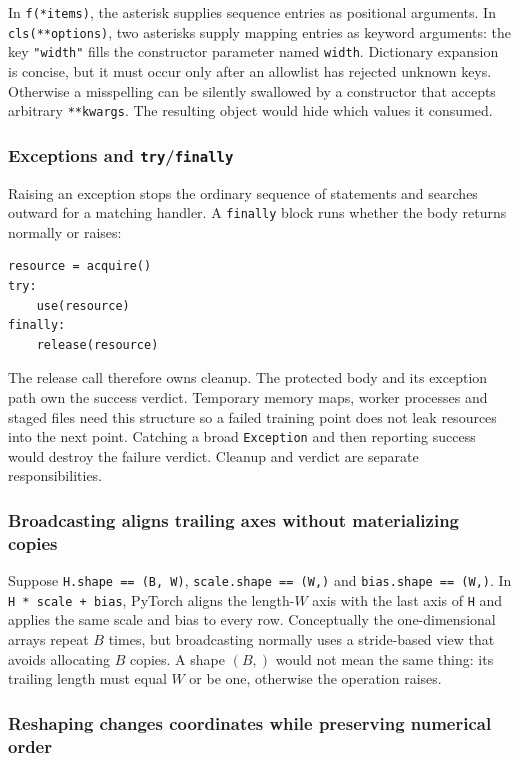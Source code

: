 \documentclass[10pt,aps,prd,twocolumn,nofootinbib]{revtex4-2}
\newcommand{\code}[1]{\texttt{#1}}
\begin{document}
In \code{f(*items)}, the asterisk supplies sequence entries as positional
arguments.  In \code{cls(**options)}, two asterisks supply mapping entries as
keyword arguments: the key \code{"width"} fills the constructor parameter
named \code{width}.  Dictionary expansion is concise, but it must occur only
after an allowlist has rejected unknown keys.  Otherwise a misspelling can be
silently swallowed by a constructor that accepts arbitrary
\code{**kwargs}.  The resulting object would hide which values it consumed.

\subsubsection{Exceptions and \code{try}/\code{finally}}

Raising an exception stops the ordinary sequence of statements and searches
outward for a matching handler.  A \code{finally} block runs whether the body
returns normally or raises:
\begin{verbatim}
resource = acquire()
try:
    use(resource)
finally:
    release(resource)
\end{verbatim}
The release call therefore owns cleanup.  The protected body and its exception
path own the success verdict.  Temporary memory maps, worker processes and staged files need this structure so a failed training
point does not leak resources into the next point.  Catching a broad
\code{Exception} and then reporting success would destroy the failure
verdict.  Cleanup and verdict are separate responsibilities.

\subsubsection{Broadcasting aligns trailing axes without materializing copies}

Suppose \code{H.shape == (B, W)}, \code{scale.shape == (W,)} and
\code{bias.shape == (W,)}.  In \code{H * scale + bias}, PyTorch aligns the
length-$W$ axis with the last axis of \code{H} and applies the same scale and
bias to every row.  Conceptually the one-dimensional arrays repeat $B$ times,
but broadcasting normally uses a stride-based view that avoids allocating
$B$ copies.  A shape $(B,)$ would not mean the same thing: its trailing length
must equal $W$ or be one, otherwise the operation raises.

\subsubsection{Reshaping changes coordinates while preserving numerical order}
\end{document}
